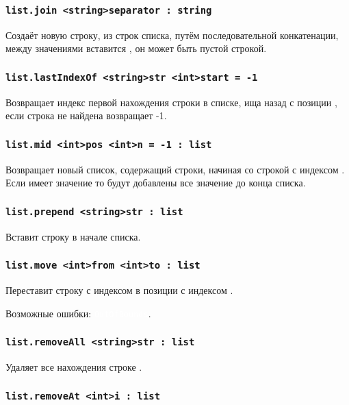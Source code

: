 \documentclass[a4paper, 14pt]{extarticle}
\newcommand{\ferror}[1]{{\fontsize{11pt}{12pt} \tt \colorbox{function}{\textcolor{white}{#1}}}}
\begin{document}
\subsubsection{\lstinline|list.join <string>separator : string|}

Создаёт новую строку, из строк списка, путём последовательной конкатенации, между значениями вставится , он может быть пустой строкой.

\subsubsection{\lstinline|list.lastIndexOf <string>str <int>start = -1|}

Возвращает индекс первой нахождения строки  в списке, ища назад с позиции , если строка не найдена возвращает -1.

\subsubsection{\lstinline|list.mid <int>pos <int>n = -1 : list|}

Возвращает новый список, содержащий  строки, начиная со строкой с индексом . Если  имеет значение  то будут добавлены все значение до конца списка.

\subsubsection{\lstinline|list.prepend <string>str : list|}

Вставит строку  в начале списка.

\subsubsection{\lstinline|list.move <int>from <int>to : list|}

Переставит строку с индексом  в позиции с индексом .

Возможные ошибки: \ferror{OutOfBounds}.

\subsubsection{\lstinline|list.removeAll <string>str : list|}

Удаляет все нахождения строке .

\subsubsection{\lstinline|list.removeAt <int>i : list|}
\end{document}
